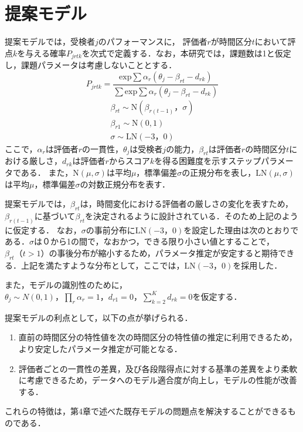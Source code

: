 \documentclass[a4paper,11pt,oneside,openany]{jsbook}
\begin{document}
\chapter{提案モデル}
提案モデルでは，受検者$j$のパフォーマンスに， 評価者$r$が時間区分$t$において評点$k$を与える確率$P_{jrtk}$を次式で定義する．なお，本研究では，課題数は1と仮定し，課題パラメータは考慮しないこととする．
\begin{displaymath}
P_{jrtk}=\frac{\mathrm{exp}\sum{\alpha_r(\theta_{j}-\beta_{rt}-d_{rk})}}{\sum \mathrm{exp}\sum{\alpha_r(\theta_{j}-\beta_{rt}-d_{rk})}}
\end{displaymath}
\begin{eqnarray}
  \beta_{rt}\sim \mathrm{N}(\beta_{r(t-1)}，\sigma)\nonumber\\
  \beta_{r1} \sim \mathrm{N}(0,1)\nonumber\\
  \sigma \sim \mathrm{LN}(-3，0)\nonumber
\end{eqnarray}
ここで，$\alpha_{r}$は評価者$r$の一貫性，$\theta_{j}$は受検者$j$の能力，$\beta_{rt}は$評価者$r$の時間区分$t$における厳しさ，$d_{rk}$は評価者$r$からスコア$k$を得る困難度を示すステップパラメータである．
また，$\mathrm{N}(\mu,\sigma)$は平均$\mu$，標準偏差$\sigma$の正規分布を表し，$\mathrm{LN}(\mu,\sigma)$は平均$\mu$，標準偏差$\sigma$の対数正規分布を表す．

提案モデルでは，$\beta_{rt}$は，時間変化における評価者の厳しさの変化を表すため，$\beta_{r(t-1)}$に基づいて$\beta_{rt}$を決定されるように設計されている．そのため上記のように仮定する．
なお，$\sigma$の事前分布に$\mathrm{LN}(-3，0)$を設定した理由は次のとおりである．$\sigma$は０から1の間で，なおかつ，できる限り小さい値とすることで，$\beta_{rt}（t>1）$の事後分布が縮小するため，パラメータ推定が安定すると期待できる．上記を満たすような分布として，ここでは，$\mathrm{LN}(-3，0)$を採用した．

また，モデルの識別性のために，$\theta_{j}\sim N(0,1)，\prod_{r}\alpha_r=1，d_{r1}=0，\sum_{k=2}^{K}d_{rk}=0$を仮定する．

提案モデルの利点として，以下の点が挙げられる．
\begin{enumerate}
  \item 直前の時間区分の特性値を次の時間区分の特性値の推定に利用できるため，より安定したパラメータ推定が可能となる．
  \item 評価者ごとの一貫性の差異，及び各段階得点に対する基準の差異をより柔軟に考慮できるため，データへのモデル適合度が向上し，モデルの性能が改善する．
\end{enumerate}
これらの特徴は，第4章で述べた既存モデルの問題点を解決することができるものである．
\end{document}
